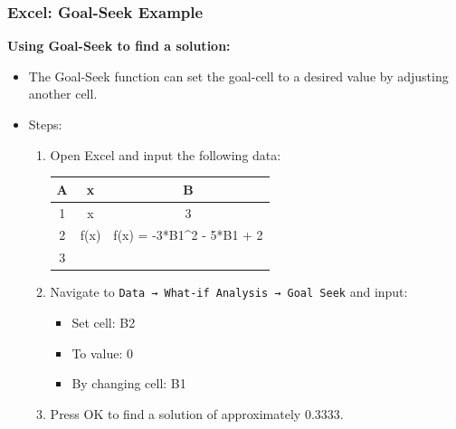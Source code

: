 \begin{frame}[fragile]
  \frametitle{Excel: Goal-Seek Example}

  \textbf{Using Goal-Seek to find a solution:}
  \begin{itemize}
    \item The Goal-Seek function can set the goal-cell to a desired value by adjusting another cell.
    \item Steps:
          \begin{enumerate}
            \item Open Excel and input the following data:

                  \begin{tabular}{|c|c|c|}
                    \hline
                    A & x    & B                            \\
                    \hline
                    1 & x    & 3                            \\
                    \hline
                    2 & f(x) & f(x) = -3*B1\^{}2 - 5*B1 + 2 \\
                    \hline
                    3 &      &                              \\
                    \hline
                  \end{tabular}

            \item Navigate to \texttt{Data → What-if Analysis → Goal Seek} and input:
                  \begin{itemize}
                    \item Set cell: B2
                    \item To value: 0
                    \item By changing cell: B1
                  \end{itemize}
            \item Press OK to find a solution of approximately 0.3333.
          \end{enumerate}
  \end{itemize}
\end{frame}

